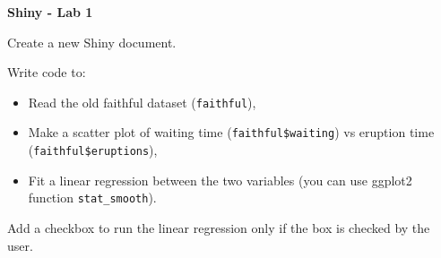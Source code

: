 \documentclass[letterpaper, 12pt]{article}
\begin{document}
\begin{center}
\textbf{\Large{Shiny - Lab 1}}
\end{center}

\vspace{2em}

Create a new Shiny document.

\vspace{1em}

Write code to:
\begin{itemize}
	\item Read the old faithful dataset (\verb|faithful|),
	\item Make a scatter plot of waiting time (\verb|faithful$waiting|) vs eruption time (\verb|faithful$eruptions|),
	\item Fit a linear regression between the two variables (you can use ggplot2 function \verb|stat_smooth|).
\end{itemize}

\vspace{1em}

Add a checkbox to run the linear regression only if the box is checked by the user.
 
\end{document}
